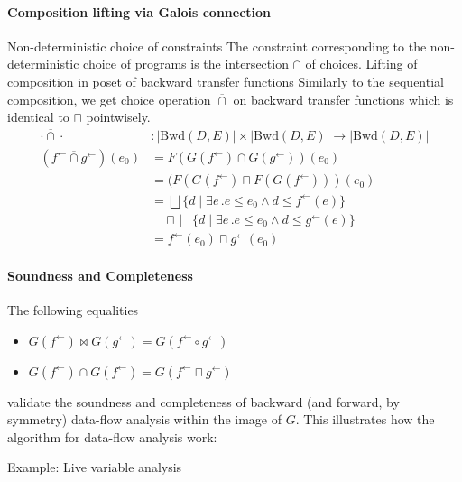 \documentclass{llncs}
\newcommand{\Unidir}{\mathrm{Bwd}}
\newcommand{\fb}{{f^{\leftarrow}}}
\newcommand{\gb}{{g^{\leftarrow}}}
\newcommand{\bigjoin}{\bigsqcup}
\newcommand{\meet}{\sqcap}
\newcommand{\comp}{\circ}
\newcommand{\caplift}{\mathbin{\overline{\cap}}}
\begin{document}
  \paragraph{Composition lifting via Galois connection}

  Non-deterministic choice of constraints
    The constraint corresponding to the non-deterministic choice of programs is the intersection $\cap$ of choices.
 Lifting of composition in poset of backward transfer functions
    Similarly to the sequential composition, we get choice operation $\caplift$ on backward transfer functions which is identical to $\meet$ pointwisely.
    \begin{align*}
      \cdot \caplift \cdot &: \left| \Unidir(D , E) \right| \times  \left| \Unidir(D, E) \right| \to \left| \Unidir(D, E) \right| \\
      (\fb \caplift \gb) (e_{0})
      &= F(G(\fb) \cap G(\gb)) (e_{0}) \\
      &= (F(G(\fb) \meet F(G(\fb))) (e_{0}) \\
      &= \bigjoin \{ d \mid \exists e\,. e \leq e_{0} \land d \leq \fb(e) \} \\ &\quad \meet \bigjoin \{ d \mid \exists e\,. e \leq e_{0} \land d \leq \gb(e) \} \\
      &= \fb(e_{0}) \meet \gb(e_{0})
    \end{align*}


  \paragraph{Soundness and Completeness}
  The following equalities
  \begin{itemize}
    \item $G(\fb) \bowtie G(\gb) = G(\fb \comp \gb)$
    \item $G(\fb) \cap G(\fb) = G(\fb \meet \gb)$
  \end{itemize}
  validate the soundness and completeness of backward (and forward, by symmetry) data-flow analysis within the image of $G$.  This illustrates how the algorithm for data-flow analysis work:


  Example: Live variable analysis
   \begin{center}
  \end{center}
\end{document}
